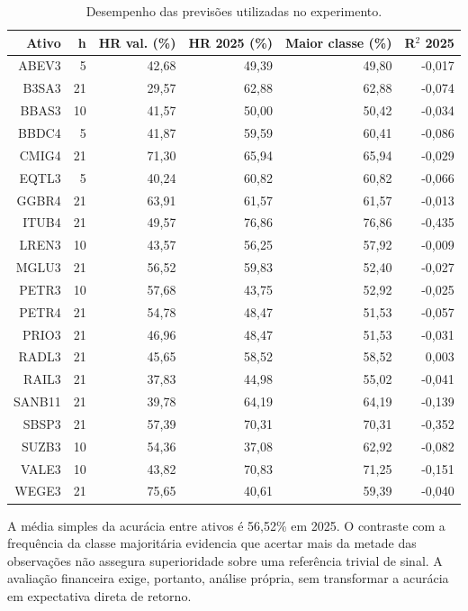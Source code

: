 \begin{table}[H]
\centering
\caption{Desempenho das previsões utilizadas no experimento.}
\label{tab:previsoes_pool_2025}
{\footnotesize
\begin{tabular}{@{}rrrrrr@{}}
\hline
Ativo & h & HR val. (\%) & HR 2025 (\%) & Maior classe (\%) & R$^{2}$ 2025 \\ \hline
ABEV3 & 5 & 42,68 & 49,39 & 49,80 & -0,017 \\
B3SA3 & 21 & 29,57 & 62,88 & 62,88 & -0,074 \\
BBAS3 & 10 & 41,57 & 50,00 & 50,42 & -0,034 \\
BBDC4 & 5 & 41,87 & 59,59 & 60,41 & -0,086 \\
CMIG4 & 21 & 71,30 & 65,94 & 65,94 & -0,029 \\
EQTL3 & 5 & 40,24 & 60,82 & 60,82 & -0,066 \\
GGBR4 & 21 & 63,91 & 61,57 & 61,57 & -0,013 \\
ITUB4 & 21 & 49,57 & 76,86 & 76,86 & -0,435 \\
LREN3 & 10 & 43,57 & 56,25 & 57,92 & -0,009 \\
MGLU3 & 21 & 56,52 & 59,83 & 52,40 & -0,027 \\
PETR3 & 10 & 57,68 & 43,75 & 52,92 & -0,025 \\
PETR4 & 21 & 54,78 & 48,47 & 51,53 & -0,057 \\
PRIO3 & 21 & 46,96 & 48,47 & 51,53 & -0,031 \\
RADL3 & 21 & 45,65 & 58,52 & 58,52 & 0,003 \\
RAIL3 & 21 & 37,83 & 44,98 & 55,02 & -0,041 \\
SANB11 & 21 & 39,78 & 64,19 & 64,19 & -0,139 \\
SBSP3 & 21 & 57,39 & 70,31 & 70,31 & -0,352 \\
SUZB3 & 10 & 54,36 & 37,08 & 62,92 & -0,082 \\
VALE3 & 10 & 43,82 & 70,83 & 71,25 & -0,151 \\
WEGE3 & 21 & 75,65 & 40,61 & 59,39 & -0,040 \\
\hline
\end{tabular}}
\par{}
\end{table}

A média simples da acurácia entre ativos é 56,52\% em 2025. O contraste com a frequência da classe majoritária evidencia que acertar mais da metade das observações não assegura superioridade sobre uma referência trivial de sinal. A avaliação financeira exige, portanto, análise própria, sem transformar a acurácia em expectativa direta de retorno.

